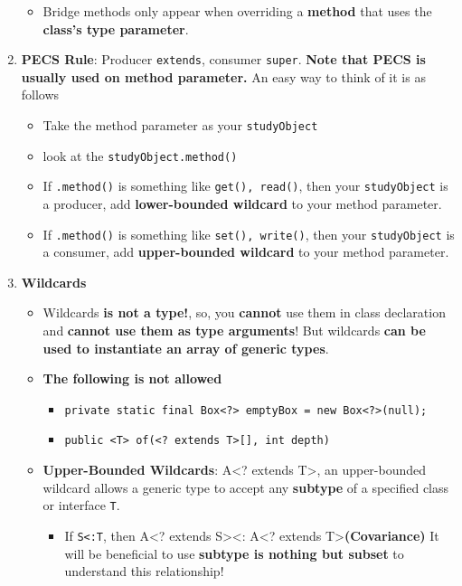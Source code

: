 \documentclass[10pt, landscape]{article}
\begin{document}
\begin{multicols}{4}
\begin{enumerate}
\begin{itemize}
        \item Bridge methods only appear when overriding a \textbf{method} that uses the \textbf{class’s type parameter}.
    \end{itemize}
    \item \textbf{PECS Rule}: Producer \texttt{extends}, consumer \texttt{super}. \textbf{Note that PECS is usually used on method parameter.} An easy way to think of it is as follows
    \begin{itemize}
        \item Take the method parameter as your \texttt{studyObject}
        \item look at the \texttt{studyObject.method()}
        \item If \texttt{.method()} is something like \texttt{get(), read()}, then your \texttt{studyObject} is a producer, add \textbf{lower-bounded wildcard} to your method parameter.
        \item If \texttt{.method()} is something like \texttt{set(), write()}, then your \texttt{studyObject} is a consumer, add \textbf{upper-bounded wildcard} to your method parameter.
    \end{itemize}
    \item \textbf{Wildcards}
    \begin{itemize}
        \item Wildcards \textbf{is not a type!}, so, you \textbf{cannot} use them in class declaration and \textbf{cannot use them as type arguments}! But wildcards \textbf{can be used to instantiate an array of generic types}.
        \item \textbf{The following is not allowed}
        \begin{itemize}
            \item \texttt{private static final Box<?> emptyBox = new Box<?>(null);}
            \item \texttt{public <T> of(<? extends T>[], int depth) {}}
        \end{itemize}
        \item \textbf{Upper-Bounded Wildcards}: A\textless? extends T\textgreater, an upper-bounded wildcard allows a generic type to accept any \textbf{subtype} of a specified class or interface \texttt{T}. 
        \begin{itemize}
            \item If \texttt{S<:T}, then A\textless? extends S\textgreater \textless: A\textless? extends T\textgreater \textbf{(Covariance)} It will be beneficial to use \textbf{subtype is nothing but subset} to understand this relationship!

\end{itemize}
\end{itemize}
\end{enumerate}
\end{multicols}
\end{document}
